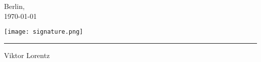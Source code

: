 \vspace{0.2cm}
\noindent{}
\begin{minipage}[t]{2.5cm}
Berlin, \\\today
\end{minipage}
\begin{minipage}[t]{8cm}
\begin{minipage}[t]{8cm}
    \centering
    \texttt{[image: signature.png]}\\[-2.3em]
    \rule{4cm}{0.4pt}
\end{minipage}

\hspace{26mm}Viktor Lorentz
\end{minipage}